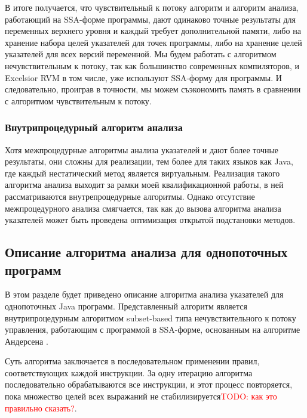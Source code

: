 \documentclass[14pt,titlepage]{extarticle}
\newcommand{\todo}[1]{\textcolor{red}{\eng{TODO}: #1}}
\newcommand{\eng}[1]{{\English#1}}
\begin{document}
      В итоге получается, что чувствительный к потоку алгоритм и алгоритм
      анализа, работающий на SSA-форме программы, дают
      одинаково точные результаты для переменных верхнего уровня и каждый
      требует дополнительной памяти, либо
      на хранение набора целей указателей для точек программы, либо на хранение
      целей указателей для всех версий переменной.
      Мы будем работать с алгоритмом нечувствительным к потоку, так как
      большинство современных компиляторов, и \eng{Excelsior RVM} в том числе,
      уже используют SSA-форму для программы. И следовательно, проиграв в
      точности, мы можем съэкономить память в сравнении с алгоритмом
      чувствительным к потоку.

    \subsubsection{Внутрипроцедурный алгоритм анализа}

      Хотя межпроцедурные алгоритмы анализа указателей и дают более точные
      результаты, они сложны для реализации, тем более для таких
      языков как Java, где каждый нестатический метод является виртуальным.
      Реализация такого алгоритма анализа выходит за рамки моей
      квалификационной работы, в ней рассматриваются внутрепроцедурные
      алгоритмы. Однако отсутствие межпроцедурного анализа смягчается, так
      как до вызова алгоритма анализа указателей может быть проведена
      оптимизация открытой подстановки методов.

    \subsection{Описание алгоритма анализа для однопоточных программ}
      \label{section:detailed_algorithm}

      В этом разделе будет приведено описание алгоритма анализа указателей
      для однопоточных Java программ.
      Представленный алгоритм является внутрипроцедурным алгоритмом
      \eng{subset-based} типа нечувствительного к потоку управления,
      работающим с программой в SSA-форме, основанным на алгоритме Андерсена
      \cite{andersen}.

      Суть алгоритма заключается в последовательном применении правил,
      соответствующих каждой инструкции. За одну итерацию алгоритма
      последовательно обрабатываются все инструкции, и этот процесс
      повторяется, пока множество целей всех выражаний не
      стабилизируется\todo{как это правильно сказать?}.
\end{document}
